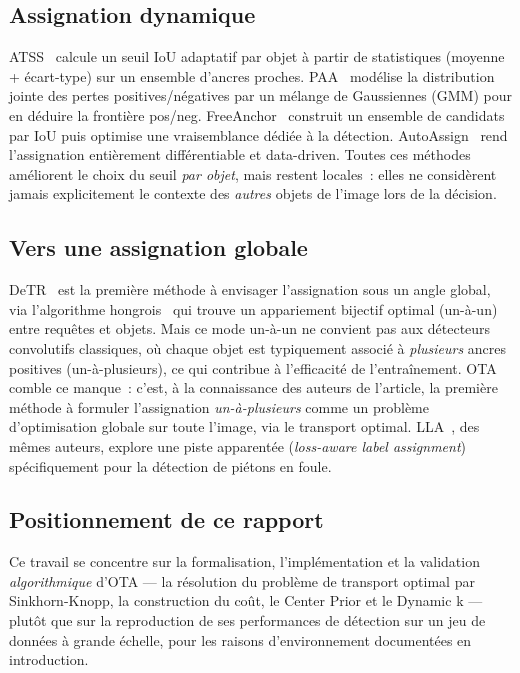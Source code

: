 \documentclass[11pt,a4paper]{article}
\begin{document}
\subsection{Assignation dynamique}
ATSS~\cite{zhang2020atss} calcule un seuil IoU adaptatif par objet à partir de statistiques (moyenne + écart-type) sur un ensemble d'ancres proches. PAA~\cite{kim2020paa} modélise la distribution jointe des pertes positives/négatives par un mélange de Gaussiennes (GMM) pour en déduire la frontière pos/neg. FreeAnchor~\cite{zhang2019freeanchor} construit un ensemble de candidats par IoU puis optimise une vraisemblance dédiée à la détection. AutoAssign~\cite{zhu2020autoassign} rend l'assignation entièrement différentiable et data-driven. Toutes ces méthodes améliorent le choix du seuil \emph{par objet}, mais restent locales~: elles ne considèrent jamais explicitement le contexte des \emph{autres} objets de l'image lors de la décision.

\subsection{Vers une assignation globale}
DeTR~\cite{carion2020detr} est la première méthode à envisager l'assignation sous un angle global, via l'algorithme hongrois~\cite{kuhn1955hungarian} qui trouve un appariement bijectif optimal (un-à-un) entre requêtes et objets. Mais ce mode un-à-un ne convient pas aux détecteurs convolutifs classiques, où chaque objet est typiquement associé à \emph{plusieurs} ancres positives (un-à-plusieurs), ce qui contribue à l'efficacité de l'entraînement. OTA~\cite{ge2021ota} comble ce manque~: c'est, à la connaissance des auteurs de l'article, la première méthode à formuler l'assignation \emph{un-à-plusieurs} comme un problème d'optimisation globale sur toute l'image, via le transport optimal. LLA~\cite{ge2021lla}, des mêmes auteurs, explore une piste apparentée (\emph{loss-aware label assignment}) spécifiquement pour la détection de piétons en foule.

\subsection{Positionnement de ce rapport}
Ce travail se concentre sur la formalisation, l'implémentation et la validation \emph{algorithmique} d'OTA --- la résolution du problème de transport optimal par Sinkhorn-Knopp, la construction du coût, le Center Prior et le Dynamic k --- plutôt que sur la reproduction de ses performances de détection sur un jeu de données à grande échelle, pour les raisons d'environnement documentées en introduction.
\end{document}
